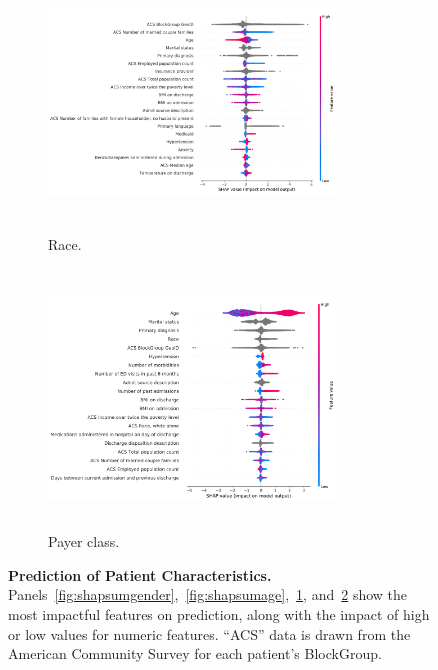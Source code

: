 \begin{figure}
\begin{adjustbox}{minipage=7.0in,frame}
\vspace{5mm}
\begin{subfigure}[t]{.45\linewidth}
    \centering
    \captionsetup[subfigure]{}
    \caption{Race. }\label{fig:shapsumrace}
    \includegraphics[height=2.7in,width=3in]{other/race_SHAP_summary.pdf}
\end{subfigure}%
\hspace{5mm}%
\begin{subfigure}[t]{.45\linewidth}
    \centering
    \captionsetup[subfigure]{}
    \caption{Payer class.}\label{fig:shapsuminsurance}
    \includegraphics[height=2.7in,width=3in]{other/insurance_SHAP_summary.pdf}
\end{subfigure}%

\caption{\textbf{Prediction of Patient Characteristics.} \\
Panels~\ref{fig:shapsumgender},~\ref{fig:shapsumage},~\ref{fig:shapsumrace}, and~\ref{fig:shapsuminsurance} 
show the most impactful features on prediction, 
along with the impact of high or low values for numeric features. 
``ACS'' data is drawn from the American Community Survey for each patient's BlockGroup.
}\label{fig:otherfig}
\end{adjustbox}
\end{figure}
